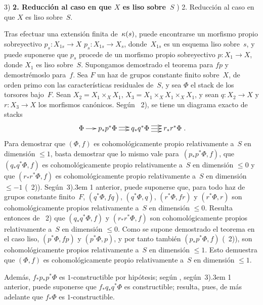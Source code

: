 {3) \textbf{2. Reducción al caso en que $X$ es liso sobre~$S$}}%
{) 2. Reducción al caso en que $X$ es liso sobre~$S$.}%
\par\nopagebreak
Tras efectuar una extensión finita de~$\kappa(s)$, puede encontrarse un
morfismo propio sobreyectivo
{$p_s\colon X_{1s}\to X$}
{$p_s\colon X_{1s}\to X_s$},
donde~$X_{1s}$ es un esquema liso sobre~$s$, y puede suponerse que
$p_s$ procede de un morfismo propio sobreyectivo
$p\colon X_1 \to X$, donde $X_1$ es liso sobre~$S$.
Supongamos demostrado el teorema para $fp$ y demostrémoslo para~$f$.
Sea $F$ un haz de grupos constante finito sobre~$X$, de orden primo con
las características residuales de~$S$, y sea $\Phi$ el stack de los
torsores bajo~$F$. Sean $X_2=X_1 \times_X X_1$,
$X_3=X_1 \times_X X_1 \times_X X_1$, y sean
$q\colon X_2 \to X$ y $r\colon X_3 \to X$ los morfismos canónicos.
Según ~2), se tiene un diagrama exacto de stacks
$$
\xymatrix@C=.5cm{\Phi \ar[r] & p_*p^*\Phi \ar@<2pt>[r]\ar@<-2pt>[r] &
q_*q^*\Phi \ar@<4pt>[r] \ar[r] \ar@<-4pt>[r] & r_*r^*\Phi}\quoi.
$$
Para demostrar que $(\Phi,f)$ es cohomológicamente propio relativamente
a~$S$ en dimensión $\leqslant 1$, basta demostrar que lo mismo vale
para~$(p_*p^*\Phi,f)$, que $(q_*q^*\Phi, f )$ es cohomológicamente
propio relativamente a~$S$ en dimensión $\leqslant 0$ y que
$(r_*r^*\Phi,f)$ es cohomológicamente propio relativamente a~$S$ en
dimensión $\leqslant -1$ (~2)). Según~3)\kern.3em 1
anterior, puede suponerse que, para todo haz de grupos constante
finito~$F$, $(q^*\Phi,fq)$, $(q^*\Phi,q)$, $(r^*\Phi,fr)$ y
$(r^*\Phi,r)$ son cohomológicamente propios relativamente a~$S$ en
dimensión $\leqslant 0$. Resulta entonces de ~2) que
$(q_*q^*\Phi,f)$ y $(r_*r^*\Phi,f)$ son cohomológicamente propios
relativamente a~$S$ en dimensión $\leqslant 0$. Como se supone
demostrado el teorema en el caso liso, $(p^*\Phi,fp)$ y
$(p^*\Phi,p)$, y por tanto también $(p_*p^*\Phi,f)$
(~2)), son cohomológicamente propios relativamente a~$S$
en dimensión $\leqslant 1$. Esto demuestra que $(\Phi,f)$ es
cohomológicamente propio relativamente a~$S$ en dimensión
$\leqslant 1$.

Además, $f_*p_*p^*\Phi$ es $1$-constructible por hipótesis;
{según ,}
{según~3)\kern.3em 1 anterior,}
puede suponerse que $f_*q_*q^*\Phi$ es constructible; resulta, pues,
de  más adelante que $f_*\Phi$ es $1$-constructible.
